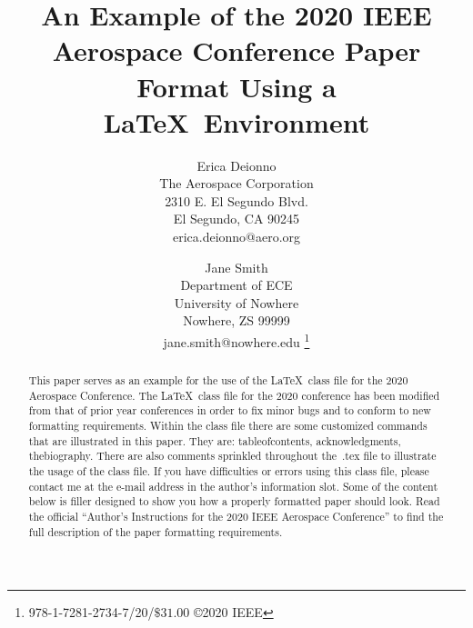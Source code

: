 \documentclass[twocolumn,letterpaper]{IEEEAerospaceCLS}  %
\begin{document}
\title{An Example of the 2020 IEEE Aerospace Conference Paper Format Using a \LaTeX~Environment}

\author{%
Erica Deionno\\ 
The Aerospace Corporation\\
2310 E. El Segundo Blvd.\\
El Segundo, CA 90245\\
erica.deionno@aero.org
\and 
Jane Smith\\
Department of ECE\\
University of Nowhere\\
Nowhere, ZS 99999\\
jane.smith@nowhere.edu
\thanks{\footnotesize 978-1-7281-2734-7/20/$\$31.00$ \copyright2020 IEEE}              %
}



\maketitle

\thispagestyle{plain}
\pagestyle{plain}


\begin{abstract}
This paper serves as an example for the use of the \LaTeX~class file for the 2020 Aerospace Conference. The \LaTeX~class file for the 2020 conference has been modified from that of prior year conferences in order to fix minor bugs and to conform to new formatting requirements. Within the class file there are some customized commands that are illustrated in this paper. They are: tableofcontents, acknowledgments, thebiography. There are also comments sprinkled throughout the~.tex file to illustrate the usage of the class file. If you have difficulties or errors using this class file, please contact me at the e-mail address in the author's information slot. Some of the content below is filler designed to show you how a properly formatted paper should look. Read the official ``Author's Instructions for the 2020 IEEE Aerospace Conference'' to find the full description of the paper formatting requirements.
\end{abstract}
\end{document}
